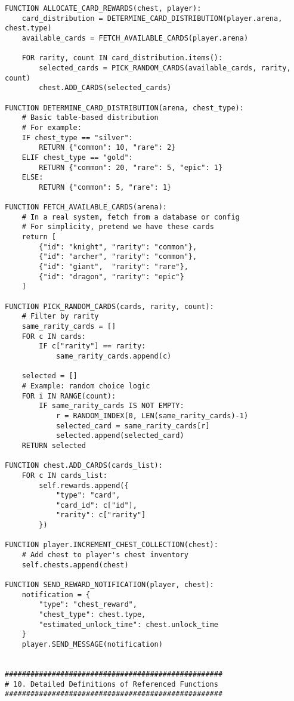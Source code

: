 \documentclass{article}
\begin{document}
\begin{lstlisting}[style=pseudo]
FUNCTION ALLOCATE_CARD_REWARDS(chest, player):
    card_distribution = DETERMINE_CARD_DISTRIBUTION(player.arena, chest.type)
    available_cards = FETCH_AVAILABLE_CARDS(player.arena)

    FOR rarity, count IN card_distribution.items():
        selected_cards = PICK_RANDOM_CARDS(available_cards, rarity, count)
        chest.ADD_CARDS(selected_cards)

FUNCTION DETERMINE_CARD_DISTRIBUTION(arena, chest_type):
    # Basic table-based distribution
    # For example:
    IF chest_type == "silver":
        RETURN {"common": 10, "rare": 2}
    ELIF chest_type == "gold":
        RETURN {"common": 20, "rare": 5, "epic": 1}
    ELSE:
        RETURN {"common": 5, "rare": 1}

FUNCTION FETCH_AVAILABLE_CARDS(arena):
    # In a real system, fetch from a database or config
    # For simplicity, pretend we have these cards
    return [
        {"id": "knight", "rarity": "common"},
        {"id": "archer", "rarity": "common"},
        {"id": "giant",  "rarity": "rare"},
        {"id": "dragon", "rarity": "epic"}
    ]

FUNCTION PICK_RANDOM_CARDS(cards, rarity, count):
    # Filter by rarity
    same_rarity_cards = []
    FOR c IN cards:
        IF c["rarity"] == rarity:
            same_rarity_cards.append(c)

    selected = []
    # Example: random choice logic
    FOR i IN RANGE(count):
        IF same_rarity_cards IS NOT EMPTY:
            r = RANDOM_INDEX(0, LEN(same_rarity_cards)-1)
            selected_card = same_rarity_cards[r]
            selected.append(selected_card)
    RETURN selected

FUNCTION chest.ADD_CARDS(cards_list):
    FOR c IN cards_list:
        self.rewards.append({
            "type": "card",
            "card_id": c["id"],
            "rarity": c["rarity"]
        })

FUNCTION player.INCREMENT_CHEST_COLLECTION(chest):
    # Add chest to player's chest inventory
    self.chests.append(chest)

FUNCTION SEND_REWARD_NOTIFICATION(player, chest):
    notification = {
        "type": "chest_reward",
        "chest_type": chest.type,
        "estimated_unlock_time": chest.unlock_time
    }
    player.SEND_MESSAGE(notification)


###################################################
# 10. Detailed Definitions of Referenced Functions
###################################################


\end{lstlisting}
\end{document}
